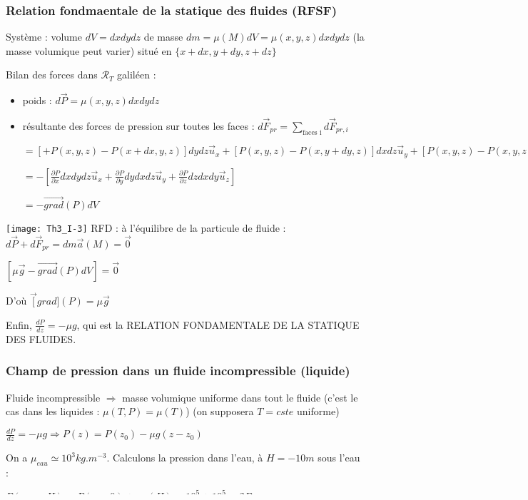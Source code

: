 \documentclass[a4paper,12pt]{book}
\begin{document}
\subsubsection{Relation fondmaentale de la statique des fluides (RFSF)}
Système : volume $dV=dxdydz$ de masse $dm =\mu(M)dV=\mu(x,y,z)dxdydz$ (la masse volumique peut varier) situé en $\{x+dx, y+dy, z+dz\}$
\par Bilan des forces dans $\mathcal{R}_T$ galiléen :\begin{itemize}
\item poids : $d\vec{P}=\mu(x,y,z)dxdydz$
\item résultante des forces de pression sur toutes les faces : $d\vec{F}_{pr} = \sum\limits_{\text{faces i}}d\vec{F}_{pr,i}$\par$ = [+ P(x,y,z)-P(x+dx,y,z)]dydz\vec{u}_x+[P(x,y,z)-P(x,y+dy,z)]dxdz\vec{u}_y+[P(x,y,z)-P(x,y,z+dz)]dxdy\vec{u}_z$ \par $=-\left[\frac{\partial P}{\partial x}dxdydz\vec{u}_x+\frac{\partial P}{\partial y}dydxdz\vec{u}_y+\frac{\partial P}{\partial z}dzdxdy\vec{u}_z\right]$ \par $= -\overrightarrow{grad}(P)dV$
\end{itemize}
\texttt{[image: Th3\_I-3]}
RFD : à l'équilibre de la particule de fluide : $d\vec{P}+d\vec{F}_{pr}=dm\vec{a}(M)=\vec{0}$ \par $[\mu\vec{g}-\overrightarrow{grad}(P)dV]=\vec{0}$ \par D'où $\overrightarrow[grad](P)=\mu\vec{g}$\par Enfin, $\frac{dP}{dz}=-\mu g$, qui est la RELATION FONDAMENTALE DE LA STATIQUE DES FLUIDES.

\subsubsection{Champ de pression dans un fluide incompressible (liquide)}
Fluide incompressible $\Rightarrow$ masse volumique uniforme dans tout le fluide (c'est le cas dans les liquides : $\mu(T,P)=\mu(T)$) (on supposera $T=cste$ uniforme)
\par $\frac{dP}{dz}=-\mu g \Rightarrow P(z)=P(z_0)-\mu g(z-z_0)$
\par On a $\mu_{eau}\simeq 10^3 kg.m^{-3}$. Calculons la pression dans l'eau, à $H = -10m$ sous l'eau : \par $P(z=-H) = P(z=0)+ \mu g(H) \simeq 10^5 + 10^5 = 2P_{atm}$
\par Calculons la pression dans la fosse des îles Marianne ($H=10 km$) :
\par $$ P(H)\sim 10^3P_{atm} $$
\par Application :
\par \texttt{[image: Th3\_I-4]}
\par $$ P(B) = P(A) + \mu g H = 10^5 + 10^4 > P_{atm} $$
\par Pour $H=1m$
\par Comme $P(B)>P_{atm}$, on à que le fluide dans le siphon "pousse", ce qui fait un écoulement tant que le niveau du récipient du haut est supérieur à celui du récipient du bas.
\end{document}
